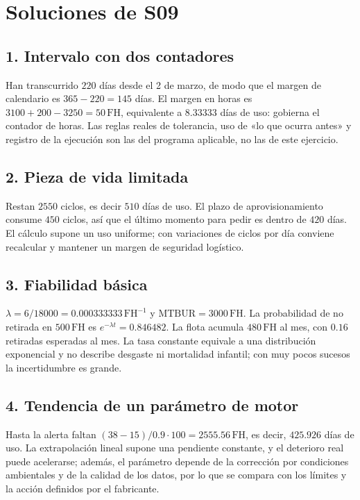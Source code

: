 

\chapter{Soluciones de S09}
\section{1. Intervalo con dos contadores}
Han transcurrido $220$ días desde el 2 de marzo, de modo que el margen de calendario es $365-220=145$ días. El margen en horas es $3100+200-3250=50\,\mathrm{FH}$, equivalente a $8.33333$ días de uso: gobierna el contador de horas. Las reglas reales de tolerancia, uso de «lo que ocurra antes» y registro de la ejecución son las del programa aplicable, no las de este ejercicio.

\section{2. Pieza de vida limitada}
Restan $2550$ ciclos, es decir $510$ días de uso. El plazo de aprovisionamiento consume $450$ ciclos, así que el último momento para pedir es dentro de $420$ días. El cálculo supone un uso uniforme; con variaciones de ciclos por día conviene recalcular y mantener un margen de seguridad logístico.

\section{3. Fiabilidad básica}
$\lambda=6/18000=0.000333333\,\mathrm{FH^{-1}}$ y $\mathrm{MTBUR}=3000\,\mathrm{FH}$. La probabilidad de no retirada en $500\,\mathrm{FH}$ es $e^{-\lambda t}=0.846482$. La flota acumula $480\,\mathrm{FH}$ al mes, con $0.16$ retiradas esperadas al mes. La tasa constante equivale a una distribución exponencial y no describe desgaste ni mortalidad infantil; con muy pocos sucesos la incertidumbre es grande.

\section{4. Tendencia de un parámetro de motor}
Hasta la alerta faltan $(38-15)/0.9\cdot100=2555.56\,\mathrm{FH}$, es decir, $425.926$ días de uso. La extrapolación lineal supone una pendiente constante, y el deterioro real puede acelerarse; además, el parámetro depende de la corrección por condiciones ambientales y de la calidad de los datos, por lo que se compara con los límites y la acción definidos por el fabricante.

